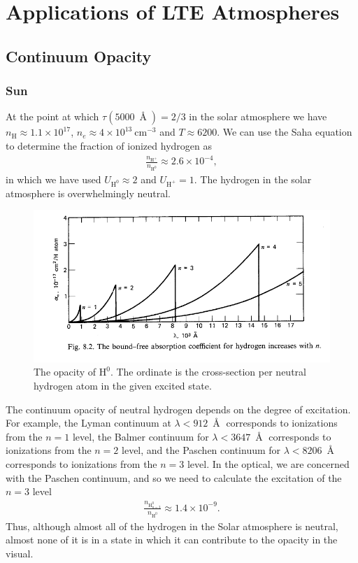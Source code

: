 
\chapter{Applications of LTE Atmospheres}

\section{Continuum Opacity}

\subsection{Sun}

At the point at which $\tau(5000\:{\Angstrom}) = 2/3$ in the
solar atmosphere we have $n_\mathrm{H} \approx 1.1 \times
10^{17}$, $n_e \approx 4 \times 10^{13}\:\mathrm{cm^{-3}}$
and $T \approx 6200$. We can use the Saha equation to
determine the fraction of ionized hydrogen as
\begin{align}
\frac{n_\mathrm{H^+}}{n_\mathrm{H^0}}
\approx 
2.6 \times 10^{-4},
\end{align}
in which we have used $U_\mathrm{H^0} \approx 2$ and
$U_\mathrm{H^+} = 1$. The hydrogen in the solar atmosphere
is overwhelmingly neutral. 

\begin{figure}
\centering
\includegraphics[width=0.7\linewidth]{figures/h-zero.pdf}
\caption{The opacity of $\mathrm{H}^0$. The ordinate is the cross-section per neutral hydrogen atom in the given excited state.}
\end{figure}

The continuum opacity of neutral hydrogen depends on the
degree of excitation. For example, the Lyman continuum at
$\lambda < 912\:{\Angstrom}$ corresponds to ionizations from
the $n=1$ level, the Balmer continuum for $\lambda <
3647\:{\Angstrom}$ corresponds to ionizations from the $n=2$
level, and the Paschen continuum for $\lambda <
8206\:{\Angstrom}$ corresponds to ionizations from the $n=3$
level. In the optical, we are concerned with the Paschen
continuum, and so we need to calculate the excitation of the
$n=3$ level
\begin{align}
\frac{n_{\mathrm{H}^0_{n=3}}}{n_{\mathrm{H^0}}}
\approx
1.4 \times 10^{-9}.
\end{align}
Thus, although almost all of the hydrogen in the Solar
atmosphere is neutral, almost none of it is in a state in
which it can contribute to the opacity in the visual.

